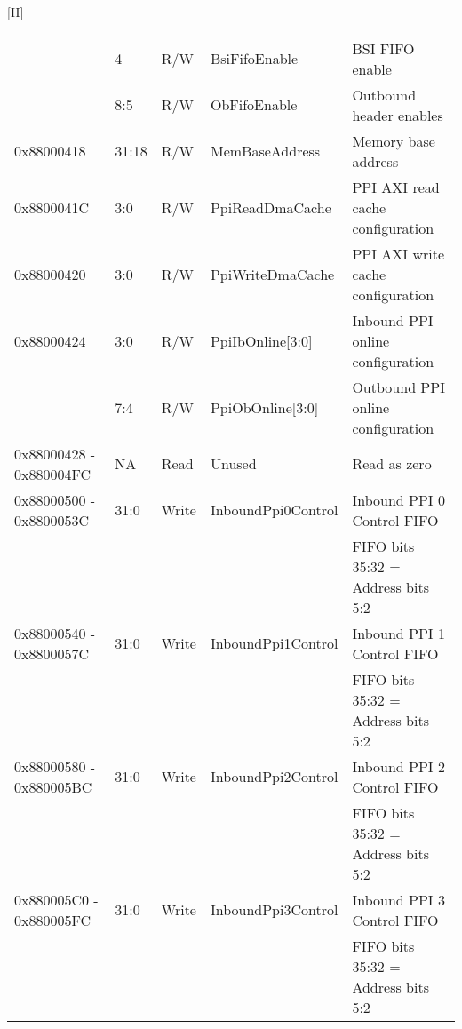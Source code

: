 \documentclass[11pt]{article}
\begin{document}
\begin{center}[H]
\begin{longtable}{| l | l | l | l | l | }
                                     & 4     & R/W   & BsiFifoEnable        & BSI FIFO enable                                \\
                                     & 8:5   & R/W   & ObFifoEnable         & Outbound header enables                        \\
      \hline 0x88000418              & 31:18 & R/W   & MemBaseAddress       & Memory base address                            \\
      \hline 0x8800041C              & 3:0   & R/W   & PpiReadDmaCache      & PPI AXI read cache configuration               \\
      \hline 0x88000420              & 3:0   & R/W   & PpiWriteDmaCache     & PPI AXI write cache configuration              \\
      \hline 0x88000424              & 3:0   & R/W   & PpiIbOnline[3:0]     & Inbound PPI online configuration              \\
                                     & 7:4   & R/W   & PpiObOnline[3:0]     & Outbound PPI online configuration             \\
      \hline 0x88000428 - 0x880004FC & NA    & Read  & Unused               & Read as zero                                   \\
      \hline 0x88000500 - 0x8800053C & 31:0  & Write & InboundPpi0Control   & Inbound PPI 0 Control FIFO                     \\
                                     &       &       &                      & FIFO bits 35:32 = Address bits 5:2             \\
      \hline 0x88000540 - 0x8800057C & 31:0  & Write & InboundPpi1Control   & Inbound PPI 1 Control FIFO                     \\
                                     &       &       &                      & FIFO bits 35:32 = Address bits 5:2             \\
      \hline 0x88000580 - 0x880005BC & 31:0  & Write & InboundPpi2Control   & Inbound PPI 2 Control FIFO                     \\
                                     &       &       &                      & FIFO bits 35:32 = Address bits 5:2             \\
      \hline 0x880005C0 - 0x880005FC & 31:0  & Write & InboundPpi3Control   & Inbound PPI 3 Control FIFO                     \\
                                     &       &       &                      & FIFO bits 35:32 = Address bits 5:2             \\

\end{longtable}
\end{center}
\end{document}
